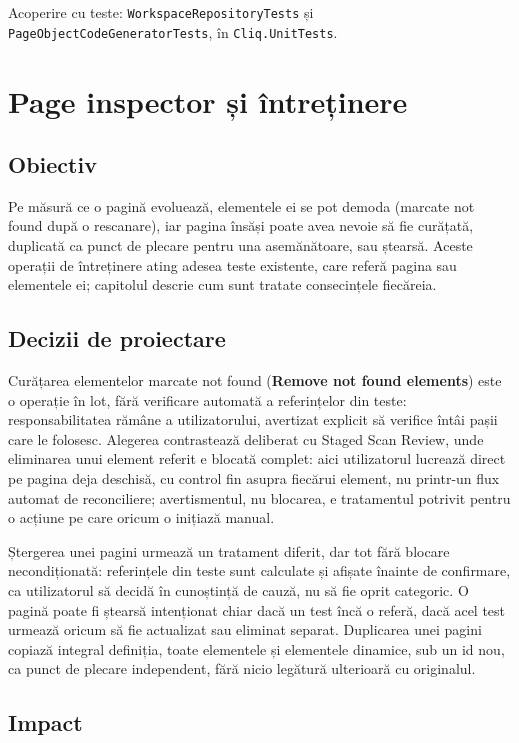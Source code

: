 \documentclass[12pt,a4paper]{report}
\newcommand{\UI}[1]{\textbf{#1}}
\newcommand{\File}[1]{\nolinkurl{#1}}
\begin{document}
Acoperire cu teste: \File{WorkspaceRepositoryTests} și \File{PageObjectCodeGeneratorTests}, în \File{Cliq.UnitTests}.

\chapter{Page inspector și întreținere}

\section{Obiectiv}

Pe măsură ce o pagină evoluează, elementele ei se pot demoda (marcate not found după o rescanare), iar pagina însăși poate avea nevoie să fie curățată, duplicată ca punct de plecare pentru una asemănătoare, sau ștearsă. Aceste operații de întreținere ating adesea teste existente, care referă pagina sau elementele ei; capitolul descrie cum sunt tratate consecințele fiecăreia.

\section{Decizii de proiectare}

Curățarea elementelor marcate not found (\UI{Remove not found elements}) este o operație în lot, fără verificare automată a referințelor din teste: responsabilitatea rămâne a utilizatorului, avertizat explicit să verifice întâi pașii care le folosesc. Alegerea contrastează deliberat cu Staged Scan Review, unde eliminarea unui element referit e blocată complet: aici utilizatorul lucrează direct pe pagina deja deschisă, cu control fin asupra fiecărui element, nu printr-un flux automat de reconciliere; avertismentul, nu blocarea, e tratamentul potrivit pentru o acțiune pe care oricum o inițiază manual.

Ștergerea unei pagini urmează un tratament diferit, dar tot fără blocare necondiționată: referințele din teste sunt calculate și afișate înainte de confirmare, ca utilizatorul să decidă în cunoștință de cauză, nu să fie oprit categoric. O pagină poate fi ștearsă intenționat chiar dacă un test încă o referă, dacă acel test urmează oricum să fie actualizat sau eliminat separat. Duplicarea unei pagini copiază integral definiția, toate elementele și elementele dinamice, sub un id nou, ca punct de plecare independent, fără nicio legătură ulterioară cu originalul.

\section{Impact}
\end{document}
